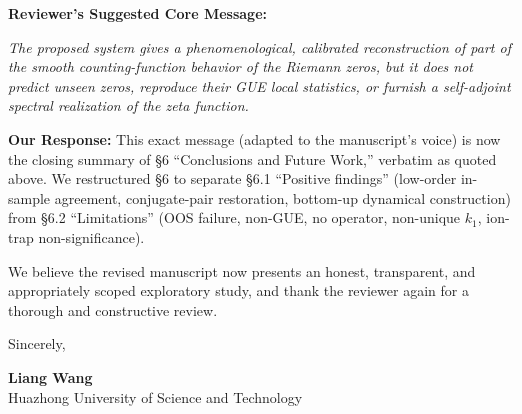 \documentclass[11pt]{article}
\begin{document}
\noindent\textbf{Reviewer's Suggested Core Message:}
\begin{quotebox}
\itshape The proposed system gives a phenomenological, calibrated reconstruction of part of the smooth counting-function behavior of the Riemann zeros, but it does not predict unseen zeros, reproduce their GUE local statistics, or furnish a self-adjoint spectral realization of the zeta function.
\end{quotebox}

\noindent\textbf{Our Response:} This exact message (adapted to the manuscript's voice) is now the closing summary of \S6 ``Conclusions and Future Work,'' verbatim as quoted above. We restructured \S6 to separate \S6.1 ``Positive findings'' (low-order in-sample agreement, conjugate-pair restoration, bottom-up dynamical construction) from \S6.2 ``Limitations'' (OOS failure, non-GUE, no operator, non-unique $k_1$, ion-trap non-significance).

\vspace{0.5cm}

\noindent We believe the revised manuscript now presents an honest, transparent, and appropriately scoped exploratory study, and thank the reviewer again for a thorough and constructive review.

\vspace{0.5cm}
\noindent Sincerely,

\noindent \textbf{Liang Wang}\\
Huazhong University of Science and Technology
\end{document}
